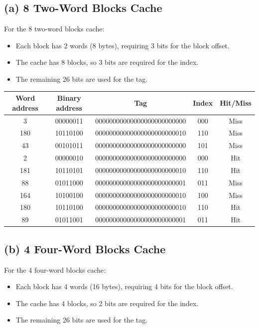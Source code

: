 \documentclass[cn,12pt]{homework}
\begin{document}
\begin{solution}


\subsection*{(a) 8 Two-Word Blocks Cache}

For the 8 two-word blocks cache:
\begin{itemize}
    \item Each block has 2 words (8 bytes), requiring 3 bits for the block offset.
    \item The cache has 8 blocks, so 3 bits are required for the index.
    \item The remaining 26 bits are used for the tag.
\end{itemize}

\begin{center}
\begin{tabular}{|c|c|c|c|c|}
\hline
Word address & Binary address & Tag & Index & Hit/Miss \\
\hline
3   & 00000011 & 00000000000000000000000000 & 000 & Miss \\
180 & 10110100 & 00000000000000000000000010 & 110 & Miss \\
43  & 00101011 & 00000000000000000000000000 & 101 & Miss \\
2   & 00000010 & 00000000000000000000000000 & 000 & Hit \\
181 & 10110101 & 00000000000000000000000010 & 110 & Hit \\
88  & 01011000 & 00000000000000000000000001 & 011 & Miss \\
164 & 10100100 & 00000000000000000000000010 & 100 & Miss \\
180 & 10110100 & 00000000000000000000000010 & 110 & Hit \\
89  & 01011001 & 00000000000000000000000001 & 011 & Hit \\
\hline
\end{tabular}
\end{center}

\subsection*{(b) 4 Four-Word Blocks Cache}

For the 4 four-word blocks cache:
\begin{itemize}
    \item Each block has 4 words (16 bytes), requiring 4 bits for the block offset.
    \item The cache has 4 blocks, so 2 bits are required for the index.
    \item The remaining 26 bits are used for the tag.
\end{itemize}


\end{solution}
\end{document}
